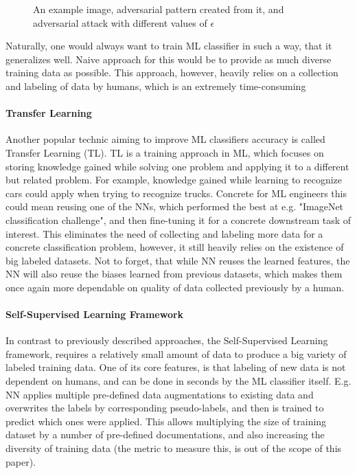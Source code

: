 \begin{figure}[h]
    \caption{An example image, adversarial pattern created from it, and adversarial attack with different values of $\epsilon$}
    \label{fig:fig-adv}
\end{figure}


Naturally, one would always want to train ML classifier in such a way, that it generalizes well.
Naive approach for this would be to provide as much diverse training data as possible.
This approach, however, heavily relies on a collection and labeling of data by humans, which is an extremely time-consuming

\paragraph{Transfer Learning}
Another popular technic aiming to improve ML classifiers accuracy is called Transfer Learning (TL).
TL is a training approach in ML, which focuses on storing knowledge gained while solving one
problem and applying it to a different but related problem.
For example, knowledge gained while learning to recognize cars could apply when trying to recognize trucks.
Concrete for ML engineers this could mean reusing one of the NNs, which performed the best at e.g.
"ImageNet classification challenge", and then fine-tuning it for a concrete downstream task of interest.
This eliminates the need of collecting and labeling more data for a concrete classification problem,
however, it still heavily relies on the existence of big labeled datasets.
Not to forget, that while NN reuses the learned features, the NN will also reuse
the biases learned from previous datasets, which makes them once again more dependable on quality of data
collected previously by a human.


\paragraph{Self-Supervised Learning Framework}
In contrast to previously described approaches, the Self-Supervised Learning framework,
requires a relatively small amount of data to produce a big variety of labeled training data.
One of its core features, is that
labeling of new data is not dependent on humans, and can be done in seconds by the ML classifier itself.
E.g. NN applies multiple pre-defined data augmentations to existing data and overwrites the labels by corresponding
pseudo-labels, and then is trained to predict which ones were applied.
This allows multiplying the size of
training dataset by a number of pre-defined documentations, and also increasing the diversity of training data
(the metric to measure this, is out of the scope of this paper).

